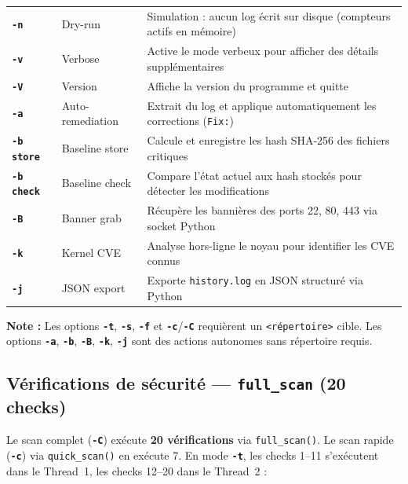 \documentclass[12pt,a4paper]{article}
\newcommand{\opt}[1]{\texttt{\textcolor{bleuMed}{\textbf{#1}}}}
\newcommand{\cmd}[1]{\texttt{\textcolor{codeText}{#1}}}
\newcommand{\fichier}[1]{\texttt{\textcolor{bleuENSET}{#1}}}
\begin{document}
\begin{longtable}{C{1.6cm} L{2.4cm} L{9.8cm}}
  \opt{-n}       & Dry-run         & Simulation : aucun log écrit sur disque (compteurs actifs en mémoire) \\
  \opt{-v}       & Verbose         & Active le mode verbeux pour afficher des détails supplémentaires \\
  \opt{-V}       & Version         & Affiche la version du programme et quitte \\
  \opt{-a}       & Auto-remediation & Extrait du log et applique automatiquement les corrections (\cmd{Fix:}) \\
  \opt{-b store} & Baseline store  & Calcule et enregistre les hash SHA-256 des fichiers critiques \\
  \opt{-b check} & Baseline check  & Compare l'état actuel aux hash stockés pour détecter les modifications \\
  \opt{-B}       & Banner grab     & Récupère les bannières des ports 22, 80, 443 via socket Python \\
  \opt{-k}       & Kernel CVE      & Analyse hors-ligne le noyau pour identifier les CVE connus \\
  \opt{-j}       & JSON export     & Exporte \fichier{history.log} en JSON structuré via Python \\
\end{longtable}

\begin{infobox}
\textbf{Note :} Les options \opt{-t}, \opt{-s}, \opt{-f} et \opt{-c}/\opt{-C} requièrent un \texttt{\textless{}répertoire\textgreater{}} cible. Les options \opt{-a}, \opt{-b}, \opt{-B}, \opt{-k}, \opt{-j} sont des actions autonomes sans répertoire requis.
\end{infobox}

\subsection{Vérifications de sécurité --- \cmd{full\_scan} (20 checks)}

Le scan complet (\opt{-C}) exécute \textbf{20 vérifications} via \cmd{full\_scan()}. Le scan rapide (\opt{-c}) via \cmd{quick\_scan()} en exécute 7. En mode \opt{-t}, les checks 1--11 s'exécutent dans le Thread~1, les checks 12--20 dans le Thread~2 :
\end{document}
